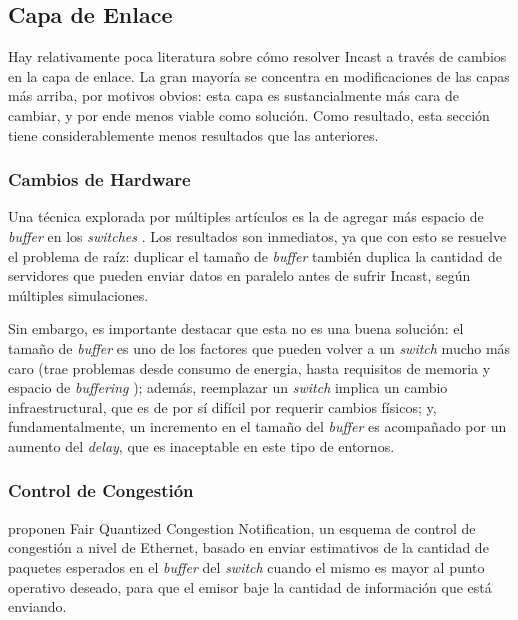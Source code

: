 \documentclass[runningheads,a4paper]{llncs}
\begin{document}
\subsection{Capa de Enlace}


Hay relativamente poca literatura sobre cómo resolver Incast a través de cambios en la capa de enlace. La gran mayoría se concentra en modificaciones de las capas más arriba, por motivos obvios: esta capa es sustancialmente más cara de cambiar, y por ende menos viable como solución. Como resultado, esta sección tiene considerablemente menos resultados que las anteriores.

\subsubsection{Cambios de Hardware}

Una técnica explorada por múltiples artículos es la de agregar más espacio de \textit{buffer} en los \textit{switches} \cite{Phanishayee_Throughput_2008} \cite{Kulkarni_Probabilistic_2011}. Los resultados son inmediatos, ya que con esto se resuelve el problema de raíz: duplicar el tamaño de \textit{buffer} también duplica la cantidad de servidores que pueden enviar datos en paralelo antes de sufrir Incast, según múltiples simulaciones.

Sin embargo, es importante destacar que esta no es una buena solución: el tamaño de \textit{buffer} es uno de los factores que pueden volver a un \textit{switch} mucho más caro (trae problemas desde consumo de energia, hasta requisitos de memoria y espacio de \textit{buffering} \cite{Shpiner_HCF_2010}); además, reemplazar un \textit{switch} implica un cambio infraestructural, que es de por sí difícil por requerir cambios físicos; y, fundamentalmente, un incremento en el tamaño del \textit{buffer} es acompañado por un aumento del \textit{delay}, que es inaceptable en este tipo de entornos.

\subsubsection{Control de Congestión}

\citet{Zhang_QCN_2011} proponen Fair Quantized Congestion Notification, un esquema de control de congestión a nivel de Ethernet, basado en enviar estimativos de la cantidad de paquetes esperados en el \textit{buffer} del \textit{switch} cuando el mismo es mayor al punto operativo deseado, para que el emisor baje la cantidad de información que está enviando.
\end{document}
